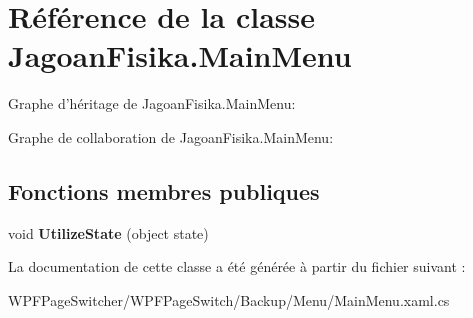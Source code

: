 \hypertarget{class_jagoan_fisika_1_1_main_menu}{\section{Référence de la classe Jagoan\+Fisika.\+Main\+Menu}
\label{class_jagoan_fisika_1_1_main_menu}
}


Graphe d'héritage de Jagoan\+Fisika.\+Main\+Menu\+:


Graphe de collaboration de Jagoan\+Fisika.\+Main\+Menu\+:
\subsection*{Fonctions membres publiques}
\begin{DoxyCompactItemize}
\item 
\hypertarget{class_jagoan_fisika_1_1_main_menu_a9cfb589a616a77f9f9d2fc8f6a4473e0}{void {\bfseries Utilize\+State} (object state)}\label{class_jagoan_fisika_1_1_main_menu_a9cfb589a616a77f9f9d2fc8f6a4473e0}

\end{DoxyCompactItemize}


La documentation de cette classe a été générée à partir du fichier suivant \+:\begin{DoxyCompactItemize}
\item 
W\+P\+F\+Page\+Switcher/\+W\+P\+F\+Page\+Switch/\+Backup/\+Menu/Main\+Menu.\+xaml.\+cs\end{DoxyCompactItemize}
